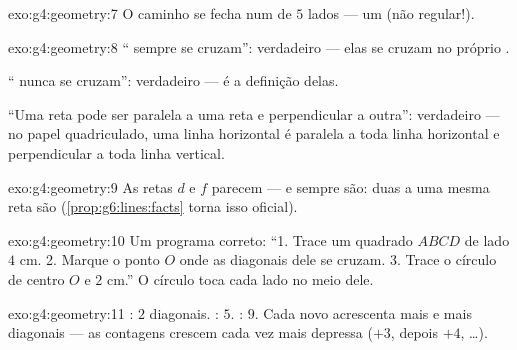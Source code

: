 \begin{solution}{exo:g4:geometry:7}
O caminho se fecha num  de $5$ lados --- um  (não
regular!).
\end{solution}

\begin{solution}{exo:g4:geometry:8}
`` sempre se cruzam'': verdadeiro --- elas se
cruzam no próprio .

`` nunca se cruzam'': verdadeiro --- é a definição
delas.

``Uma reta pode ser paralela a uma reta e perpendicular a outra'':
verdadeiro --- no papel quadriculado, uma linha horizontal é paralela
a toda linha horizontal e perpendicular a toda linha vertical.
\end{solution}

\begin{solution}{exo:g4:geometry:9}
As retas $d$ e $f$ parecem  --- e sempre são: duas  a uma mesma reta são 
(\cref{prop:g6:lines:facts} torna isso oficial).
\end{solution}

\begin{solution}{exo:g4:geometry:10}
Um programa correto: ``1. Trace um quadrado $ABCD$ de lado $4$ cm.
2. Marque o ponto $O$ onde as diagonais dele se cruzam. 3. Trace o
círculo de centro $O$ e  $2$ cm.'' O círculo toca cada lado no
meio dele.
\end{solution}

\begin{solution}{exo:g4:geometry:11}
: $2$ diagonais. : $5$. : $9$. Cada
 novo acrescenta mais e mais diagonais --- as contagens crescem
cada vez mais depressa ($+3$, depois $+4$, \dots).
\end{solution}

